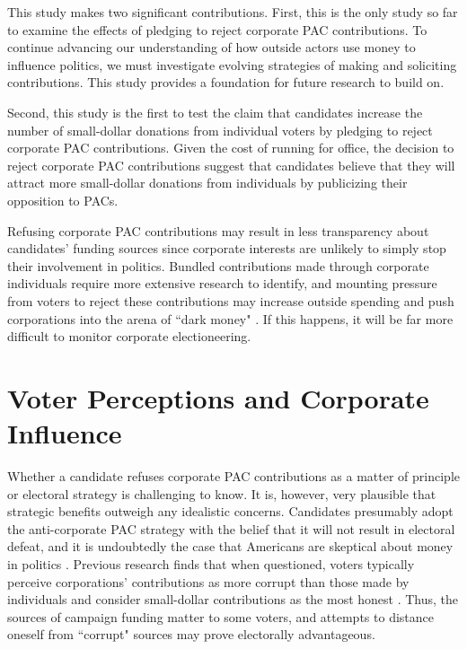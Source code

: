 \documentclass[12pt]{article}
\begin{document}
This study makes two significant contributions. First, this is the only study so far to examine the effects of pledging to reject corporate PAC contributions. To continue advancing our understanding of how outside actors use money to influence politics, we must investigate evolving strategies of making and soliciting contributions. This study provides a foundation for future research to build on.   

Second, this study is the first to test the claim that candidates increase the number of small-dollar donations from individual voters by pledging to reject corporate PAC contributions. Given the cost of running for office, the decision to reject corporate PAC contributions suggest that candidates believe that they will attract more small-dollar donations from individuals by publicizing their opposition to PACs. 

Refusing corporate PAC contributions may result in less transparency about candidates' funding sources since corporate interests are unlikely to simply stop their involvement in politics. Bundled contributions made through corporate individuals require more extensive research to identify, and mounting pressure from voters to reject these contributions may increase outside spending and push corporations into the arena of ``dark money" \citep{opensecrets.org2019, massoglia2021}. If this happens, it will be far more difficult to monitor corporate electioneering.


\section{Voter Perceptions and Corporate Influence}

Whether a candidate refuses corporate PAC contributions as a matter of principle or electoral strategy is challenging to know. It is, however, very plausible that strategic benefits outweigh any idealistic concerns. Candidates presumably adopt the anti-corporate PAC strategy with the belief that it will not result in electoral defeat, and it is undoubtedly the case that Americans are skeptical about money in politics \citep{lubenow2001}. Previous research finds that when questioned, voters typically perceive corporations' contributions as more corrupt than those made by individuals and consider small-dollar contributions as the most honest \citep{bowler2016}. Thus, the sources of campaign funding matter to some voters, and attempts to distance oneself from ``corrupt" sources may prove electorally advantageous. 
\end{document}
